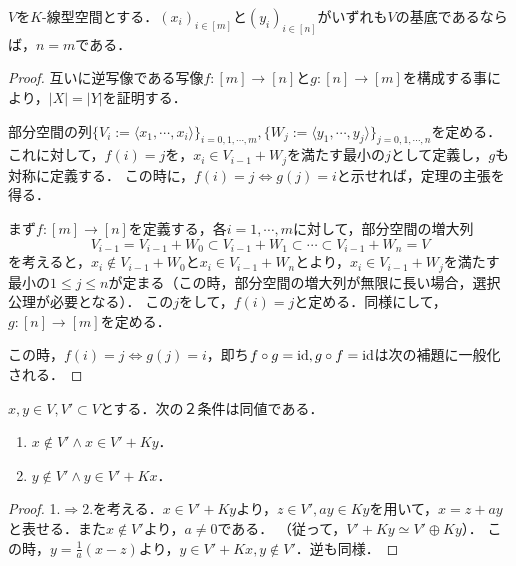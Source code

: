 \documentclass[uplatex, 12pt, dvipdfmx]{jsreport}
\begin{document}
\begin{shadebox}\begin{theorem}\label{thm-dimention}
    $V$を$K$-線型空間とする．$(x_i)_{i\in [m]}$と$(y_i)_{i\in [n]}$がいずれも$V$の基底であるならば，$n=m$である．
\end{theorem}\end{shadebox}
\begin{proof}
    互いに逆写像である写像$f:[m]\to[n]$と$g:[n]\to[m]$を構成する事により，$|X|=|Y|$を証明する．

    部分空間の列$\{V_i:=\langle x_1,\cdots,x_i\rangle\}_{i=0,1,\cdots,m},\{W_j:=\langle y_1,\cdots,y_j\rangle\}_{j=0,1,\cdots,n}$を定める．
    これに対して，$f(i)=j$を，$x_i\in V_{i-1}+W_j$を満たす最小の$j$として定義し，$g$も対称に定義する．
    この時に，$f(i)=j\Leftrightarrow g(j)=i$と示せれば，定理の主張を得る．

    まず$f:[m]\to[n]$を定義する，各$i=1,\cdots,m$に対して，部分空間の増大列
    \[ V_{i-1}=V_{i-1}+W_0\subset V_{i-1}+W_1\subset\cdots\subset V_{i-1}+W_n=V \]
    を考えると，$x_i\notin V_{i-1}+W_0$と$x_i\in V_{i-1}+W_n$とより，$x_i\in V_{i-1}+W_j$を満たす最小の$1\le j\le n$が定まる（この時，部分空間の増大列が無限に長い場合，選択公理が必要となる）．
    この$j$をして，$f(i)=j$と定める．同様にして，$g:[n]\to[m]$を定める．

    この時，$f(i)=j\Leftrightarrow g(j)=i$，即ち$f\circ g=\mathrm{id},g\circ f=\mathrm{id}$は次の補題に一般化される．
\end{proof}
\begin{lemma}\label{lemma-welldefinedness-of-expansion-of-subspaces}
    $x,y\in V, V'\subset V$とする．次の２条件は同値である．
    \begin{enumerate}
        \item $x\notin V'\land x\in V'+Ky$．
        \item $y\notin V'\land y\in V'+Kx$．
    \end{enumerate}
\end{lemma}
\begin{proof}
    1.$\Rightarrow$2.を考える．$x\in V'+Ky$より，$z\in V', ay\in Ky$を用いて，$x=z+ay$と表せる．また$x\notin V'$より，$a\ne 0$である．
    （従って，$V'+Ky\simeq V'\oplus Ky$）．
    この時，$y=\frac{1}{a}(x-z)$より，$y\in V'+Kx, y\notin V'$．逆も同様．
\end{proof}
\end{document}
